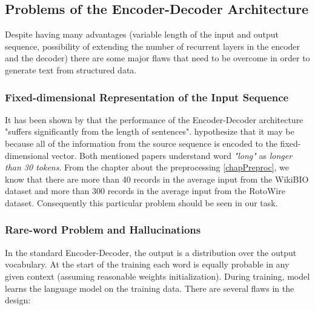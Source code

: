 \subsection{Problems of the Encoder-Decoder Architecture}

Despite having many advantages (variable length of the input and output sequence, possibility of extending the number of recurrent layers in the encoder and the decoder) there are some major flaws that need to be overcome in order to generate text from structured data.

\subsubsection{Fixed-dimensional Representation of the Input Sequence} \label{fixed_repre_problem}

It has been shown by \citep{cho2014properties} that the performance of the Encoder-Decoder architecture "suffers significantly from the length of sentences". \citep{bahdanau2016neural} hypothesize that it may be because all of the information from the source sequence is encoded to the fixed-dimensional vector. Both mentioned papers understand word \emph{"long"} as \emph{longer than 30 tokens}. From the chapter about the preprocessing \ref{chapPreproc}, we know that there are more than 40 records in the average input from the WikiBIO dataset and more than 300 records in the average input from the RotoWire dataset. Consequently this particular problem should be seen in our task. 

\subsubsection{Rare-word Problem and Hallucinations} \label{rare_word_problem}

In the standard Encoder-Decoder, the output is a distribution over the output vocabulary. At the start of the training each word is equally probable in any given context (assuming reasonable weights initialization). During training, model learns the language model on the training data. There are several flaws in the design:

